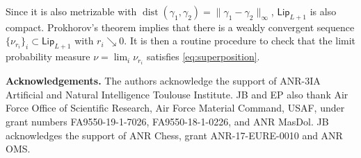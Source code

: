 \documentclass[11pt]{article}
\theoremstyle{definition}
\theoremstyle{remark}
\DeclareMathOperator{\dist}{dist}
\newcommand{\lipschitz}{\mathsf{Lip}}
\begin{document}
Since it is also metrizable with $\dist(\gamma_1,\gamma_2)=\|\gamma_1-\gamma_2\|_{\infty}$, $\lipschitz_{L+1}$ is also compact. Prokhorov's theorem \cite{prokhorov} implies that there is a weakly convergent sequence $\{\nu_{r_i}\}_i\subset\lipschitz_{L+1}$ with $r_i\searrow0$. It is then a routine procedure to check that the limit probability measure $\nu=\lim_i\nu_{r_i}$ satisfies \eqref{eq:superposition}.

\medskip

\noindent
{\bf Acknowledgements.} The authors acknowledge the support of ANR-3IA Artificial and Natural Intelligence Toulouse Institute. JB and EP also thank Air Force Office of Scientific Research, Air Force Material Command, USAF, under grant numbers FA9550-19-1-7026, FA9550-18-1-0226, and ANR MasDol. JB acknowledges the support of ANR Chess, grant ANR-17-EURE-0010 and ANR OMS.



%

 {}
 
\end{document}
